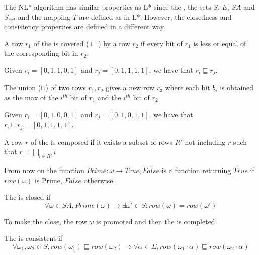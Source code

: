 The NL* algorithm has similar properties as L* since the \OT, the sets $S$, $E$, $SA$ and $S_{ext}$ and the mapping $T$ are defined as in L*. However, the closedness and consistency properties are defined in a different way.

\begin{definition}
  \label{def:row-covering}
  A row $r_1$ of the \OT is covered ($\sqsubseteq$) by a row $r_2$ if every bit of $r_1$ is less or equal of the corresponding bit in $r_2$.
\end{definition}

\begin{example}
  Given $r_i = [0,1,1,0,1]$ and $r_j = [0,1,1,1,1]$, we have that $r_i \sqsubseteq r_j$.
\end{example}

\begin{definition}
  \label{def:row-union}
  The union ($\sqcup$) of two rows $r_1, r_2$ gives a new row $r_3$ where each bit $b_i$ is obtained as the max of the $i^{th}$ bit of $r_1$ and the $i^{th}$ bit of $r_2$
\end{definition}

\begin{example}
  Given $r_i = [0,1,0,0,1]$ and $r_j = [0,1,0,1,1]$, we have that $r_i \sqcup r_j = [0,1,1,1,1]$.
\end{example}

\begin{definition}
  A row $r$ of the \OT is composed if it exists a subset of rows $R'$ not including $r$ such that $r = \bigsqcup\limits_{i \in R'}i$
\end{definition}

\begin{notation}
  From now on the function $Prime: \omega \rightarrow {True, False}$ is a function returning $True$ if $row(\omega)$ is Prime, $False$ otherwise.
\end{notation}

\begin{definition}[Closedness]
  The \OT is closed if
  \[\forall \omega \in SA, Prime(\omega) \rightarrow \exists \omega' \in S: row(\omega) = row(\omega')\]
\end{definition}

To make the \OT close, the row $\omega$ is promoted and then the \OT is completed.

\begin{definition}[Consistency]
  The \OT is consistent if
  \[
    \forall \omega_1, \omega_2 \in S,
    row(\omega_1) \sqsubseteq row( \omega_2) \rightarrow
    \forall \alpha \in \Sigma,
    row(\omega_1 \cdot \alpha) \sqsubseteq row(\omega_2 \cdot \alpha)
  \]
\end{definition}

